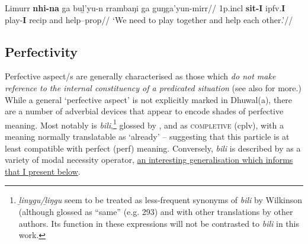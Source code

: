 \pex{}\begingl\gla Limurr \textbf{nhi-na} ga buḻ'yu-n rrambaŋi ga guŋga'yun-mirr//
\glb 1p.\gls{incl} \textbf{sit-I} \gls{ipfv}.\textbf{I} play-\textbf{I} \gls{recip} and help--\gls{prop}//
\glft`We need to play together and help each other.'//\endgl

\xe


\subsection{Perfectivity}\label{PFV}

 Perfective aspect/s are generally characterised as those which \textit{do not make reference to the internal constituency of a predicated situation} (see also \citealp[§1.1]{Comrie1976} for more.) While a general `perfective aspect' is not explicitly marked in Dhuwal(a), there are a number of adverbial devices that appear to encode shades of perfective meaning. Most notably is \textit{bili},\footnote{\textit{ḻinygu/ḻiŋgu} seem to be treated as less-frequent synonyms of \textit{bili} by Wilkinson (although glossed as ``same'' (e.g. 293) and with other translations by other authors. Its function in these expressions will not be contrasted to \textit{bili} in this work.} glossed by \citet[367]{Wilkinson1991}, \citet[145]{Morphy1983} and \citeauthor{Lowe1996}  as \textsc{completive} (\gls{cplv}), with a meaning normally translatable as `already' -- suggesting that this particle is at least compatible with perfect (\gls{perf}) meaning. Conversely, \textit{bili} is described by \citet[127]{VanderWal1992} as a variety of modal necessity operator, \ul{an interesting generalisation which informs that I present below}.

